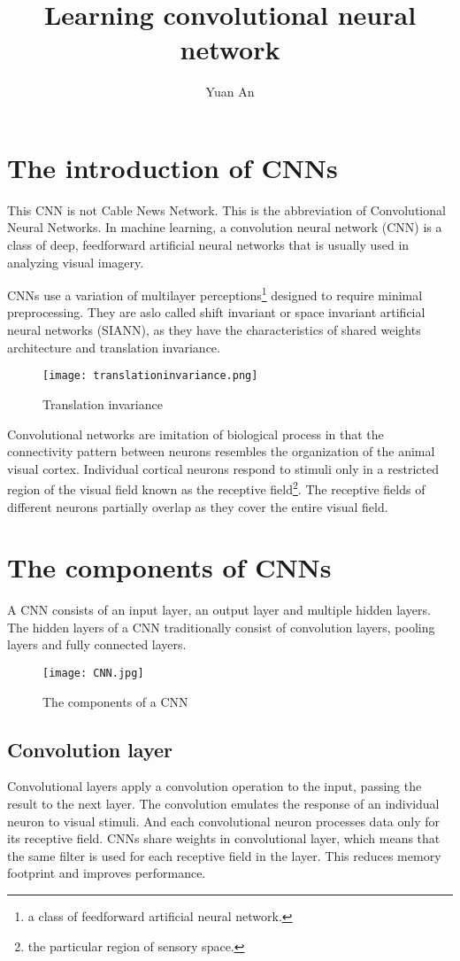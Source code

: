 \documentclass[a4paper, 12pt]{article}
\title{Learning convolutional neural network}
\author{Yuan An}
\begin{document}
\maketitle
\section*{The introduction of CNNs}
This CNN is not Cable News Network. This is the abbreviation of Convolutional Neural Networks. In machine learning, a convolution neural network (CNN)\cite{CNNwikipedia} is a class of deep, feedforward artificial neural networks that is usually used in analyzing visual imagery. 
\par
CNNs use a variation of multilayer perceptions\footnote{a class of feedforward artificial neural network.} designed to require minimal preprocessing. They are aslo called shift invariant or space invariant artificial neural networks (SIANN), as they have the characteristics of shared weights architecture and translation invariance.
\begin{figure}[h]
	\centering
	\texttt{[image: translationinvariance.png]}
	\caption{Translation invariance}\label{figure1}
\end{figure}
Convolutional networks are imitation of biological process in that the connectivity pattern between neurons resembles the organization of the animal visual cortex. Individual cortical neurons respond to stimuli only in a restricted region of the visual field known as the receptive field\footnote{the particular region of sensory space.}. The receptive fields of different neurons partially overlap as they cover the entire visual field.
\par
\section*{The components of CNNs}
A CNN consists of an input layer, an output layer and multiple hidden layers. The hidden layers of a CNN traditionally consist of convolution layers, pooling layers and fully connected layers.
\par
\begin{figure}[h]
	\centering
	\texttt{[image: CNN.jpg]}
	\caption{The components of a CNN}
\end{figure}
\subsection*{Convolution layer} 
Convolutional layers apply a convolution operation to the input, passing the result to the next layer. The convolution emulates the response of an individual neuron to visual stimuli. And each convolutional neuron processes data only for its receptive field.
CNNs share weights in convolutional layer, which means that the same filter is used for each receptive field in the layer. This reduces memory footprint and improves performance.
\end{document}
